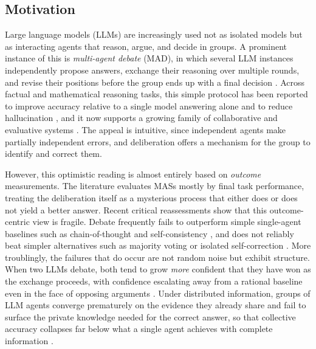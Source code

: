 \subsection{Motivation}
\label{sec:intro:motivation}

Large language models (\acsp{LLM}) are increasingly used not as isolated
models but as interacting agents that reason, argue, and decide in groups.
A prominent instance of this is \emph{multi-agent debate} (\acs{MAD}), in which
several \ac{LLM} instances independently propose answers, exchange their reasoning
over multiple rounds, and revise their positions before the group ends up with a 
final decision \citep{du2024improving}. Across factual and mathematical
reasoning tasks, this simple protocol has been reported to improve accuracy
relative to a single model answering alone
\citep{du2024improving, liang2024encouraging, chen2024reconcile} and to reduce
hallucination \citep{du2024improving}, and it now
supports a growing family of collaborative and evaluative systems
\citep{chan2024chateval}. The appeal is intuitive, since independent agents make
partially independent errors, and deliberation offers a mechanism for the group
to identify and correct them.

However, this optimistic reading is almost entirely based on \emph{outcome}
measurements. The literature evaluates \acp{MAS} mostly by
final task performance, treating the deliberation itself as a mysterious process
that either does or does not yield a better answer. Recent critical
reassessments show that this outcome-centric view is fragile. Debate frequently
fails to outperform simple single-agent baselines such as chain-of-thought and
self-consistency \citep{liu2025stopovervaluing}, and does not reliably beat
simpler alternatives such as majority voting
\citep{zhang2025debateorvote} or isolated self-correction
\citep{bertalanic2026costofconsensus}.
More troublingly, the failures that do occur are not random noise but exhibit
structure. When two \acp{LLM} debate, both tend to grow \emph{more} confident that
they have won as the exchange proceeds, with confidence escalating away from a
rational baseline even in the face of opposing arguments
\citep{prasad2025certain}. Under distributed information, groups of \ac{LLM} agents
converge prematurely on the evidence they already share and fail to surface the
private knowledge needed for the correct answer, so that collective accuracy
collapses far below what a single agent achieves with complete information
\citep{li2026hiddenbench}.

